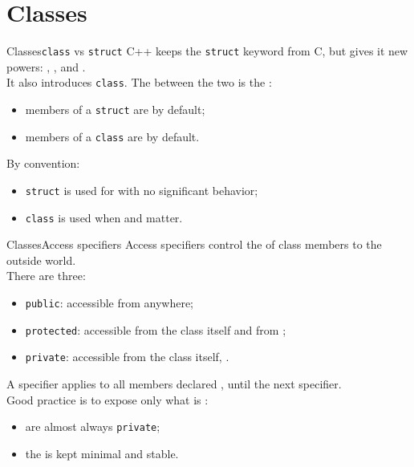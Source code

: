 
\section{Classes}
\graphicspath{{figs/section2/}}

\begin{frame}{Classes}{\texttt{class} vs \texttt{struct}}
	\justifying
	C++ keeps the \texttt{struct} keyword from C, but gives it new powers: , , and .\\
	\bigskip
	It also introduces \texttt{class}. The  between the two is the :
	\begin{itemize}
		\item members of a \texttt{struct} are  by default;
		\item members of a \texttt{class} are  by default.
	\end{itemize}
	\bigskip
	By convention:
	\begin{itemize}
		\item \texttt{struct} is used for  with no significant behavior;
		\item \texttt{class} is used when  and  matter.
	\end{itemize}
\end{frame}
\begin{frame}{Classes}{Access specifiers}
	\justifying
	Access specifiers control the  of class members to the outside world.\\
	\bigskip
	There are three:
	\begin{itemize}
		\item \texttt{public}: accessible from anywhere;
		\item \texttt{protected}: accessible from the class itself and from ;
		\item \texttt{private}: accessible  from the class itself, .
	\end{itemize}
	\bigskip
	A specifier applies to all members declared , until the next specifier.\\
	\bigskip
	Good practice is to expose only what is :
	\begin{itemize}
		\item {} are almost always \texttt{private};
		\item the  is kept minimal and stable.
	\end{itemize}
\end{frame}
